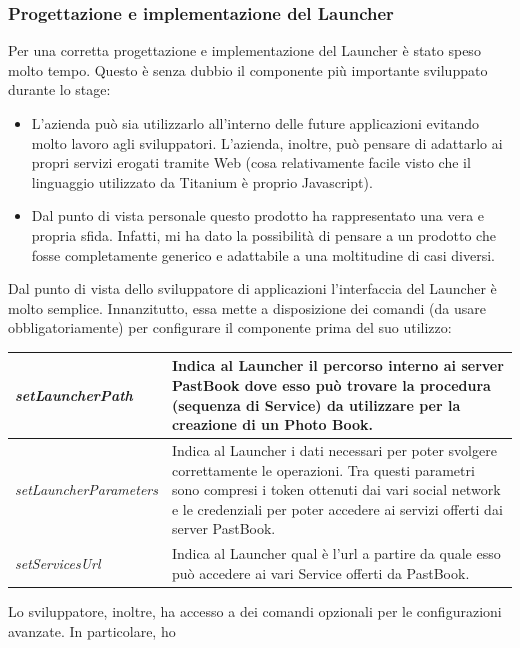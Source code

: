 			\subsubsection{Progettazione e implementazione del Launcher}
				Per una corretta progettazione e implementazione del Launcher è stato speso molto tempo. Questo è senza dubbio il
				componente più importante sviluppato durante lo stage:
				\begin{itemize}
					\item L'azienda può sia utilizzarlo all'interno delle future applicazioni evitando molto lavoro agli
					sviluppatori. L'azienda, inoltre, può pensare di adattarlo ai propri servizi erogati tramite Web (cosa
					relativamente facile visto che il linguaggio utilizzato da Titanium è proprio Javascript).
					\item Dal punto di vista personale questo prodotto ha rappresentato una vera e propria sfida. Infatti, mi ha
					dato la possibilità di pensare a un prodotto che fosse completamente generico e adattabile a una moltitudine
					di casi diversi.
				\end{itemize}
				Dal punto di vista dello sviluppatore di applicazioni l'interfaccia del Launcher è molto semplice. Innanzitutto, essa
				mette a disposizione dei comandi (da usare obbligatoriamente) per configurare il componente prima del suo utilizzo:
				\begin{center}
					\begin{tabular}[H]{p{} p{}}
						\emph{setLauncherPath}		& Indica al Launcher il percorso interno ai server PastBook dove
										  esso può trovare la procedura (sequenza di Service) da utilizzare
										  per la creazione di un Photo Book.\\
						\hline
						\emph{setLauncherParameters}	& Indica al Launcher i dati necessari per poter svolgere
										  correttamente le operazioni. Tra questi parametri sono compresi
										  i token ottenuti dai vari social network e le credenziali per
										  poter accedere ai servizi offerti dai server PastBook.\\
						\hline
						\emph{setServicesUrl}		& Indica al Launcher qual è l'url a partire da quale esso può
										  accedere ai vari Service offerti da PastBook.\\
					\end{tabular}
				\end{center}
				Lo sviluppatore, inoltre, ha accesso a dei comandi opzionali per le configurazioni avanzate. In particolare, ho
